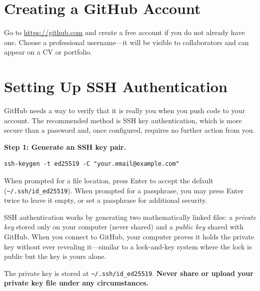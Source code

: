 \documentclass[nobib]{tufte-book}
\begin{document}
\section{Creating a GitHub Account}

Go to \url{https://github.com} and create a free account if you do not
already have one.
Choose a professional username---it will be visible to collaborators and
can appear on a CV or portfolio.

\section{Setting Up SSH Authentication}

GitHub needs a way to verify that it is really you when you push code to
your account.
The recommended method is SSH key authentication, which is more secure than
a password and, once configured, requires no further action from you.

\medskip
\noindent\textbf{Step 1: Generate an SSH key pair.}

\begin{lstlisting}[style=bashstyle]
ssh-keygen -t ed25519 -C "your.email@example.com"
\end{lstlisting}

When prompted for a file location, press Enter to accept the default
(\texttt{\textasciitilde/.ssh/id\_ed25519}).
When prompted for a passphrase, you may press Enter twice to leave it empty,
or set a passphrase for additional security.

\begin{conceptbox}[title={Public Keys and Private Keys}]
SSH authentication works by generating two mathematically linked files: a
\emph{private key} stored only on your computer (never shared) and a
\emph{public key} shared with GitHub.
When you connect to GitHub, your computer proves it holds the private key
without ever revealing it---similar to a lock-and-key system where the lock
is public but the key is yours alone.

The private key is stored at \texttt{\textasciitilde/.ssh/id\_ed25519}.
\textbf{Never share or upload your private key file under any circumstances.}
\end{conceptbox}
\end{document}

